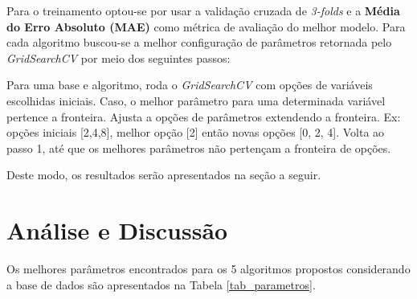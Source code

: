 \documentclass[12pt]{article}
\begin{document}
Para o treinamento optou-se por usar a validação cruzada de \textit{3-folds} e a  \textbf{Média do Erro Absoluto (MAE)} como métrica de avaliação do melhor modelo. Para cada algoritmo buscou-se a melhor configuração de parâmetros retornada pelo \textit{GridSearchCV} por meio dos seguintes passos:

\begin{outline}[enumerate]
  \1 Para uma base e algoritmo, roda o \textit{GridSearchCV} com opções de variáveis escolhidas iniciais.
  \1 Caso, o melhor parâmetro para uma determinada variável pertence a fronteira.
    \2 Ajusta a opções de parâmetros extendendo a fronteira. Ex: opções iniciais [2,4,8], melhor opção [2] então novas opções [0, 2, 4].
  \1 Volta ao passo 1, até que os melhores parâmetros não pertençam a fronteira de opções.
 \end{outline}

 Deste modo, os resultados serão apresentados na seção a seguir.

\section{Análise e Discussão}

Os melhores parâmetros encontrados para os 5 algoritmos propostos considerando a base de dados são apresentados na Tabela \ref{tab_parametros}.
\end{document}
